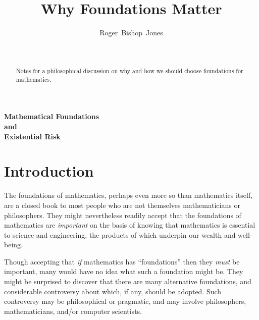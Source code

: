 \documentclass[12pt,titlepage]{article}
\title{Why Foundations Matter}
\author{Roger~Bishop~Jones}
\date{\ }
\begin{document}
                               
\begin{titlepage}
\maketitle

\begin{abstract}
Notes for a philosophical discussion on why and how we should choose foundations for mathematics.
\end{abstract}





\end{titlepage}

\setcounter{tocdepth}{2}
{\parskip-0pt\tableofcontents}



\pagebreak

\begin{centering}
{\LARGE \bf Mathematical Foundations\\
and\\
Existential Risk\\
}
\end{centering}

\section{Introduction}

The foundations of mathematics, perhaps even more so than mathematics itself, are a closed book to most people who are not themselves mathematicians or philosophers.
They might nevertheless readily accept that the foundations of mathematics are \emph{important} on the basis of knowing that mathematics is essential to science and engineering, the products of which underpin our wealth and well-being.

Though accepting that \emph{if} mathematics has ``foundations'' then they \emph{must} be important, many would have no idea what such a foundation might be.
They might be surprised to discover that there are many alternative foundations, and considerable controversy about which, if any, should be adopted.
Such controversy may be philosophical or pragmatic, and may involve philosophers, mathematicians, and/or computer scientists.
\end{document}
